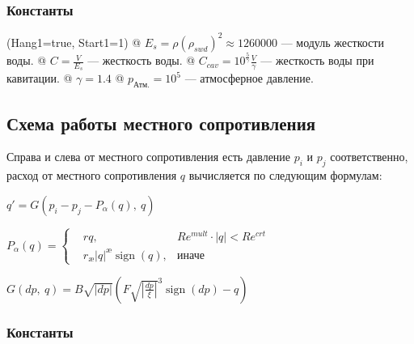 \documentclass[12pt, a4paper]{article}
\DeclareMathOperator{\sign}{sign}
\begin{document}
\subsubsection{Константы}

\begin{easylist}
\ListProperties(Hang1=true, Start1=1)
@ $ E_s = \rho (\rho_{swd})^2 \approx 1260000 $ --- модуль жесткости воды.
@ $ C = \frac{V}{E_s} $ --- жесткость воды.
@ $ C_{cav} = 10^{\frac5\gamma}\frac{V}{\gamma} $ --- жесткость воды при кавитации.
@ $ \gamma = 1.4 $ 
@ $ p_{\text{Атм.}} = 10^5 $ --- атмосферное давление.
\end{easylist}

\subsection{Схема работы местного сопротивления}

\begin{center}
\noindent
{}
\end{center}

Справа и слева от местного сопротивления есть давление $p_i$ и $p_j$ соответственно, расход от местного сопротивления $q$ вычисляется по следующим формулам:

$ q' = G(p_i-p_j-P_\alpha(q),\ q) $

$
P_\alpha(q) = \left\{
\begin{aligned}
&rq,  &Re^{mult} \cdot |q| < Re^{crt} \\
&r_\text{\ae}|q|^\text{\ae}\sign(q), & \text{иначе}
\end{aligned}
\right.
$

$ G(dp,\ q) = B\sqrt{|dp|}\left(F\sqrt{\left|\frac{dp}{\xi}\right|}^3\sign(dp) - q\right) $

\subsubsection{Константы}
\end{document}
